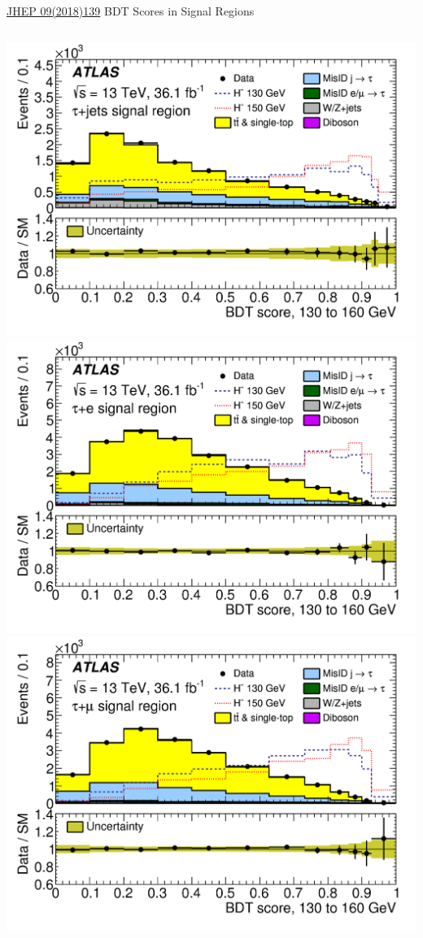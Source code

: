 \documentclass[aspectratio=169,xcolor=table]{beamer}
\begin{document}
\begin{frame}{\href{https://link.springer.com/article/10.1007/JHEP09(2018)139}{JHEP 09(2018)139} BDT Scores in Signal Regions}
\begin{columns}
        \includegraphics[height=.24\textheight,keepaspectratio=true]{taujet_SR_2018/taujet_SR_130to160_2018.png}
        \includegraphics[height=.24\textheight,keepaspectratio=true]{tauel_SR_2018/tauel_SR_130to160_2018.png}
        \includegraphics[height=.24\textheight,keepaspectratio=true]{taumu_SR_2018/taumu_SR_130to160_2018.png}


\end{columns}
\end{frame}
\end{document}
